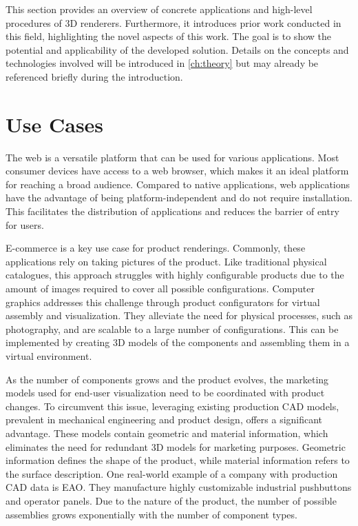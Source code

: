 
This section provides an overview of concrete applications and high-level procedures of 3D renderers. Furthermore, it introduces prior work conducted in this field, highlighting the novel aspects of this work. The goal is to show the potential and applicability of the developed solution. Details on the concepts and technologies involved will be introduced in \autoref{ch:theory} but may already be referenced briefly during the introduction.

\section{Use Cases}

The web is a versatile platform that can be used for various applications. Most consumer devices have access to a web browser, which makes it an ideal platform for reaching a broad audience. Compared to native applications, web applications have the advantage of being platform-independent and do not require installation. This facilitates the distribution of applications and reduces the barrier of entry for users.

E-commerce is a key use case for product renderings. Commonly, these applications rely on taking pictures of the product. Like traditional physical catalogues, this approach struggles with highly configurable products due to the amount of images required to cover all possible configurations. Computer graphics addresses this challenge through product configurators for virtual assembly and visualization. They alleviate the need for physical processes, such as photography, and are scalable to a large number of configurations. This can be implemented by creating 3D models of the components and assembling them in a virtual environment.

As the number of components grows and the product evolves, the marketing models used for end-user visualization need to be coordinated with product changes. To circumvent this issue, leveraging existing production \gls{CAD} models, prevalent in mechanical engineering and product design, offers a significant advantage. These models contain geometric and material information, which eliminates the need for redundant 3D models for marketing purposes. Geometric information defines the shape of the product, while material information refers to the surface description. One real-world example of a company with production \gls{CAD} data is EAO. They manufacture highly customizable industrial pushbuttons and operator panels. Due to the nature of the product, the number of possible assemblies grows exponentially with the number of component types.

